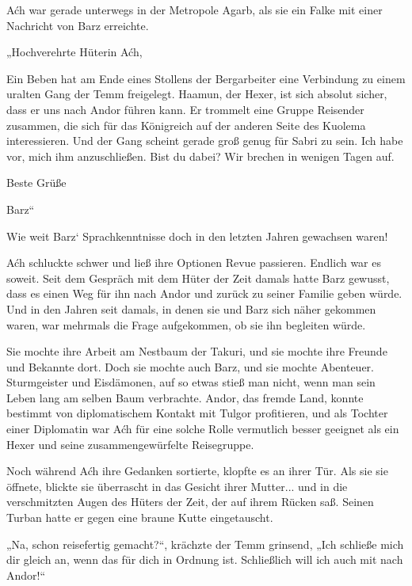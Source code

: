 \trennzeichen



Aćh war gerade unterwegs in der Metropole Agarb, als sie ein Falke mit einer Nachricht von Barz erreichte.\bigskip



„Hochverehrte Hüterin Aćh,



Ein Beben hat am Ende eines Stollens der Bergarbeiter eine Verbindung zu einem uralten Gang der Temm freigelegt. Haamun, der Hexer, ist sich absolut sicher, dass er uns nach Andor führen kann. Er trommelt eine Gruppe Reisender zusammen, die sich für das Königreich auf der anderen Seite des Kuolema interessieren. Und der Gang scheint gerade groß genug für Sabri zu sein. Ich habe vor, mich ihm anzuschließen. Bist du dabei? Wir brechen in wenigen Tagen auf.



Beste Grüße

Barz“\bigskip



Wie weit Barz‘ Sprachkenntnisse doch in den letzten Jahren gewachsen waren!

Aćh schluckte schwer und ließ ihre Optionen Revue passieren. Endlich war es soweit. Seit dem Gespräch mit dem Hüter der Zeit damals hatte Barz gewusst, dass es einen Weg für ihn nach Andor und zurück zu seiner Familie geben würde. Und in den Jahren seit damals, in denen sie und Barz sich näher gekommen waren, war mehrmals die Frage aufgekommen, ob sie ihn begleiten würde.

Sie mochte ihre Arbeit am Nestbaum der Takuri, und sie mochte ihre Freunde und Bekannte dort. Doch sie mochte auch Barz, und sie mochte Abenteuer. Sturmgeister und Eisdämonen, auf so etwas stieß man nicht, wenn man sein Leben lang am selben Baum verbrachte. Andor, das fremde Land, konnte bestimmt von diplomatischem Kontakt mit Tulgor profitieren, und als Tochter einer Diplomatin war Aćh für eine solche Rolle vermutlich besser geeignet als ein Hexer und seine zusammengewürfelte Reisegruppe.

Noch während Aćh ihre Gedanken sortierte, klopfte es an ihrer Tür. Als sie sie öffnete, blickte sie überrascht in das Gesicht ihrer Mutter... und in die verschmitzten Augen des Hüters der Zeit, der auf ihrem Rücken saß. Seinen Turban hatte er gegen eine braune Kutte eingetauscht.

„Na, schon reisefertig gemacht?“, krächzte der Temm grinsend, „Ich schließe mich dir gleich an, wenn das für dich in Ordnung ist. Schließlich will ich auch mit nach Andor!“



